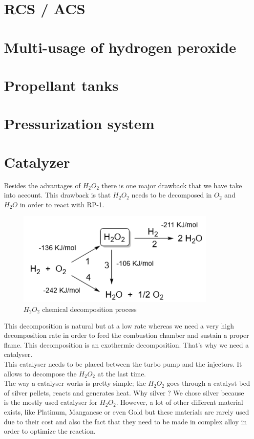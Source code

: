 \section{RCS / ACS}
\section{Multi-usage of hydrogen peroxide}
\label{sec:10-3}

\section{Propellant tanks}
\section{Pressurization system}
\section{Catalyzer}
Besides the advantages of $H_2O_2$ there is one major drawback that we have take into account. This drawback is that $H_2O_2$ needs to be decomposed in $O_2$ and $H_2O$ in order to react with RP-1. 

\begin{figure}[H]
	\centering
	\includegraphics{H2O2}
	\caption{$H_2O_2$ chemical decomposition process}
\end{figure}

This decomposition is natural but at a low rate whereas we need a very high decomposition rate in order to feed the combustion chamber and sustain a proper flame. This decomposition is an exothermic decomposition. That's why we need a catalyser. \\

This catalyser needs to be placed between the turbo pump and the injectors. It allows to decompose the $H_2O_2$ at the last time. \\

The way a catalyser works is pretty simple; the $H_2O_2$ goes through a catalyst bed of silver pellets, reacts and generates heat. 
Why silver ? We chose silver because is the mostly used catalyser for $H_2O_2$. However, a lot of other different material exists, like Platinum, Manganese or even Gold but these materials are rarely used due to their cost and also the fact that they need to be made in complex alloy in order to optimize the reaction. 

